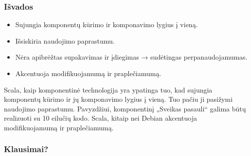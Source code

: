 \begin{frame}
  \frametitle{Išvados}
  \begin{itemize}
    \item Sujungia komponentų kūrimo ir komponavimo lygius į vieną.
    \item Išsiskiria naudojimo paprastumu.
    \item Nėra apibrėžtas supakavimas ir įdiegimas → sudėtingas
      perpanaudojamumas.
    \item Akcentuoja modifikuojamumą ir praplečiamumą.
  \end{itemize}
  \begin{handout}
    Scala, kaip komponentinė technologija yra ypatinga tuo, kad
    sujungia komponentų kūrimo ir jų komponavimo lygius į vieną.
    Tuo pačiu ji pasižymi naudojimo paprastumu. Pavyzdžiui, komponentinį
    „Sveikas pasauli“ galima būtų realizuoti su 10 eilučių kodo.
    Scala, kitaip nei Debian akcentuoja modifikuojamumą ir praplečiamumą.
  \end{handout}
\end{frame}

\begin{frame}
  \frametitle{Klausimai?}
\end{frame}
